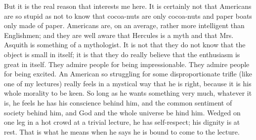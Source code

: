 \documentclass{book}
\begin{document}
But it is the real reason that interests me here. It is certainly not that Americans are so stupid as not to know that cocoa-nuts are only cocoa-nuts and paper boats only made of paper. Americans are, on an average, rather more intelligent than Englishmen; and they are well aware that Hercules is a myth and that Mrs. Asquith is something of a mythologist. It is not that they do not know that the object is small in itself; it is that they do really believe that the enthusiasm is great in itself. They admire people for being impressionable. They admire people for being excited. An American so struggling for some disproportionate trifle (like one of my lectures) really feels in a mystical way that he is right, because it is his whole morality to be keen. So long as he wants something very much, whatever it is, he feels he has his conscience behind him, and the common sentiment of society behind him, and God and the whole universe be hind him. Wedged on one leg in a hot crowd at a trivial lecture, he has self-respect; his dignity is at rest. That is what he means when he says he is bound to come to the lecture.
\end{document}
